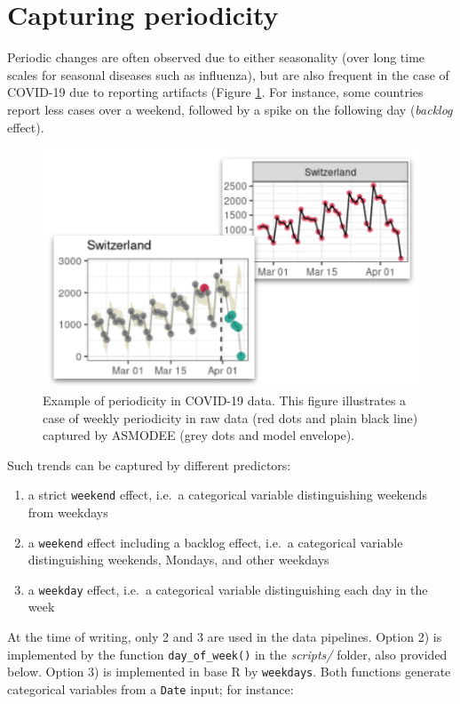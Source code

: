 \documentclass[]{book}
\providecommand{\tightlist}{%
  \setlength{\itemsep}{0pt}\setlength{\parskip}{0pt}}
\begin{document}
\hypertarget{capturing-periodicity}{%
\section{Capturing periodicity}\label{capturing-periodicity}}

Periodic changes are often observed due to either seasonality (over long time
scales for seasonal diseases such as influenza), but are also frequent in the
case of COVID-19 due to reporting artifacts (Figure
\ref{fig:asmodee-periodic}. For instance, some countries report less cases over
a weekend, followed by a spike on the following day (\emph{backlog} effect).

\begin{figure}

{\centering \includegraphics[width=0.6\linewidth]{images/asmodee_periodic} 

}

\caption{Example of periodicity in COVID-19 data. This figure illustrates a case of weekly periodicity in raw data (red dots and plain black line) captured by ASMODEE (grey dots and model envelope).}\label{fig:asmodee-periodic}
\end{figure}

Such trends can be captured by different predictors:

\begin{enumerate}
\def\labelenumi{\arabic{enumi}.}
\tightlist
\item
  a strict \texttt{weekend} effect, i.e.~a categorical variable distinguishing weekends
  from weekdays
\item
  a \texttt{weekend} effect including a backlog effect, i.e.~a categorical variable
  distinguishing weekends, Mondays, and other weekdays
\item
  a \texttt{weekday} effect, i.e.~a categorical variable distinguishing each day in the week
\end{enumerate}

At the time of writing, only 2 and 3 are used in the data pipelines. Option 2)
is implemented by the function \texttt{day\_of\_week()} in the \emph{scripts/} folder, also
provided below. Option 3) is implemented in base R by \texttt{weekdays}. Both functions
generate categorical variables from a \texttt{Date} input; for instance:
\end{document}
